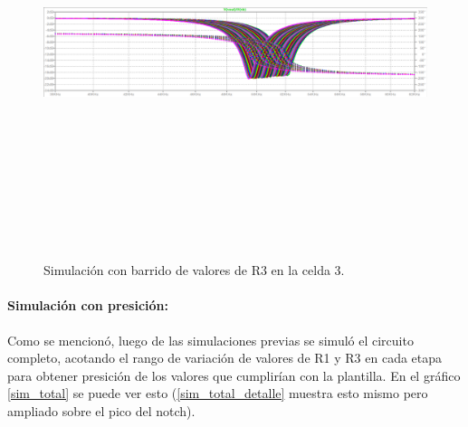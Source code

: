 \begin{figure}[H] %
	\centering	\includegraphics[width=12cm,height=12cm,keepaspectratio]{../EJ4/graficos/etapa3_R3.png}
	\caption{Simulaci\'on con barrido de valores de R3 en la celda 3.}
	\label{celda3_r3}
\end{figure}

\paragraph{Simulaci\'on con presici\'on:}
Como se mencion\'o, luego de las simulaciones previas se simul\'o el circuito completo, acotando el rango de variaci\'on de valores de R1 y R3 en cada etapa para obtener presici\'on de los valores que cumplir\'ian con la plantilla. En el gr\'afico \ref{sim_total} se puede ver esto (\ref{sim_total_detalle} muestra esto mismo pero ampliado sobre el pico del notch).


